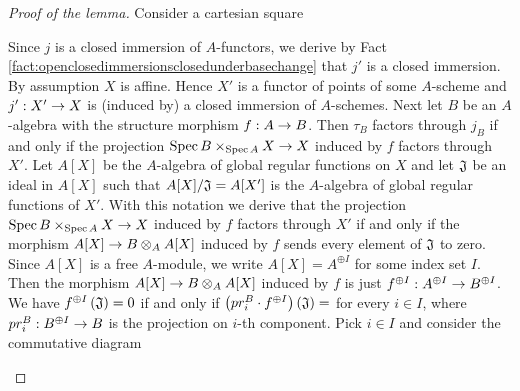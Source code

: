 \begin{proof}[Proof of the lemma]
Consider a cartesian square
\begin{center}
\end{center}
Since $j$ is a closed immersion of $A$-functors, we derive by Fact \ref{fact:openclosedimmersionsclosedunderbasechange} that $j'$ is a closed immersion. By assumption $X$ is affine. Hence $X'$ is a functor of points of some $A$-scheme and $j':X'\rightarrow X$ is (induced by) a closed immersion of $A$-schemes. Next let $B$ be an $A$-algebra with the structure morphism $f:A\rightarrow B$. Then $\tau_B$ factors through $j_B$ if and only if the projection $\mathrm{Spec}\, B\times_{\mathrm{Spec}\, A}X\rightarrow X$ induced by $f$ factors through $X'$. Let $A[X]$ be the $A$-algebra of global regular functions on $X$ and let $\mathfrak{J}$ be an ideal in $A[X]$ such that $A[X]/\mathfrak{J} = A[X']$ is the $A$-algebra of global regular functions of $X'$. With this notation we derive that the projection $\mathrm{Spec}\, B\times_{\mathrm{Spec}\, A}X\rightarrow X$ induced by $f$ factors through $X'$ if and only if the morphism $A[X]\rightarrow B\otimes_AA[X]$ induced by $f$ sends every element of $\mathfrak{J}$ to zero. Since $A[X]$ is a free $A$-module, we write $A[X] = A^{\oplus I}$ for some index set $I$. Then the morphism $A[X]\rightarrow B\otimes_AA[X]$ induced by $f$ is just $f^{\oplus I}:A^{\oplus I}\rightarrow B^{\oplus I}$. We have $f^{\oplus I}\left(\mathfrak{J}\right)=0$ if and only if $\left(pr^B_i\cdot f^{\oplus I}\right)\left(\mathfrak{J}\right)=$ for every $i\in I$, where $pr^B_i:B^{\oplus I}\rightarrow B$ is the projection on $i$-th component. Pick $i\in I$ and consider the commutative diagram
\begin{center}
\end{center}
\end{proof}
